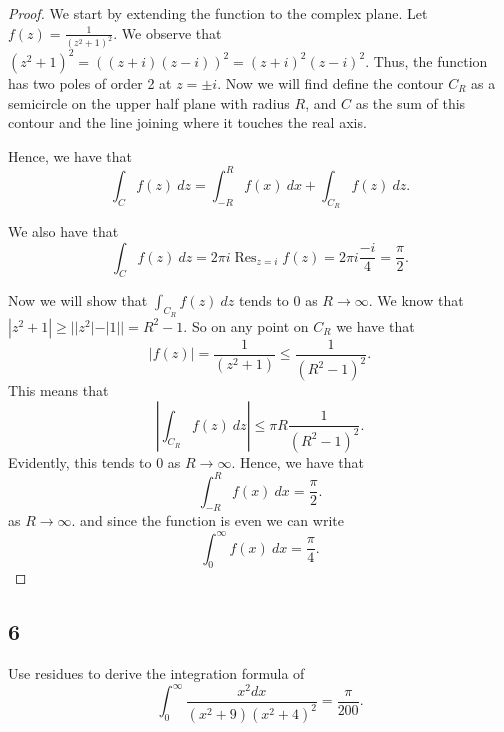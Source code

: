 \documentclass{article}
\DeclareMathOperator*{\Res}{Res}
\begin{document}
\begin{proof}
    We start by extending the function to the complex plane. Let
    ${f(z) = \frac{1}{(z^2 + 1)^2}}$.
    We observe that $(z^2 + 1)^2 = ((z + i)(z-i))^2 = (z+i)^2(z-i)^2$. Thus,
    the function has two poles of order 2 at $z = \pm i$. Now we will find
    define the contour $C_R$ as a semicircle on the upper half plane with
    radius $R$, and $C$ as the sum of this contour and the line joining
    where it touches the real axis.

    Hence, we have that
    \[\int_C f(z) \ dz = \int_{-R}^R f(x) \ dx + \int_{C_R} f(z) \ dz.\]

    We also have that
    \[\int_C f(z) \ dz  = 2\pi i \Res_{z=i} f(z) = 2\pi i\frac{-i}{4} = \frac{\pi}{2}.\]

    Now we will show that $\int_{C_R} f(z) \ dz$ tends to 0 as $R\rightarrow\infty$.
    We know that $|z^2 + 1| \geq ||z^2| - |1|| = R^2 - 1$. So on any point on $C_R$
    we have that
    \begin{equation*}
        |f(z)| = \frac{1}{(z^2 + 1)} \leq \frac{1}{(R^2 - 1)^2}.
    \end{equation*}
    This means that
    \begin{equation*}
        \left| \int_{C_R} f(z) \ dz \right| \leq \pi R\frac{1}{(R^2 -1)^2}.
    \end{equation*}
    Evidently, this tends to $0$ as $R\rightarrow\infty$.
    Hence, we have that
    \begin{equation*}
        \int_{-R}^R f(x) \ dx = \frac{\pi}{2}.
    \end{equation*}
    as $R\rightarrow\infty$.
    and since the function is even we can write
    \begin{equation*}
        \int_0^\infty f(x) \ dx = \frac{\pi}{4}.
    \end{equation*}
\end{proof}

\subsection*{6}
Use residues to derive the integration formula of
\[\int_0^\infty \frac{x^2 dx}{(x^2 + 9)(x^2 + 4)^2} = \frac{\pi}{200}.\]
\end{document}
